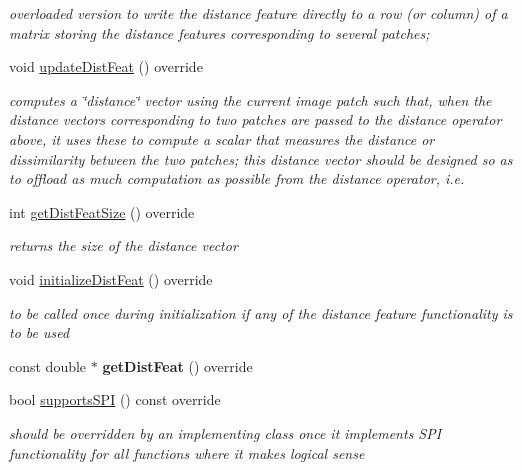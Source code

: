 \begin{DoxyCompactItemize}
\begin{DoxyCompactList}\small\item\em overloaded version to write the distance feature directly to a row (or column) of a matrix storing the distance features corresponding to several patches; \end{DoxyCompactList}\item 
void \hyperlink{classNCC_a0767a3d3ba75da9598a5817945d583bd}{update\-Dist\-Feat} () override
\begin{DoxyCompactList}\small\item\em computes a \char`\"{}distance\char`\"{} vector using the current image patch such that, when the distance vectors corresponding to two patches are passed to the distance operator above, it uses these to compute a scalar that measures the distance or dissimilarity between the two patches; this distance vector should be designed so as to offload as much computation as possible from the distance operator, i.\-e. \end{DoxyCompactList}\item 
\hypertarget{classNCC_a7df028c752f5caf03f141383ae0b8020}{int \hyperlink{classNCC_a7df028c752f5caf03f141383ae0b8020}{get\-Dist\-Feat\-Size} () override}\label{classNCC_a7df028c752f5caf03f141383ae0b8020}

\begin{DoxyCompactList}\small\item\em returns the size of the distance vector \end{DoxyCompactList}\item 
\hypertarget{classNCC_a7fb32218db2ed05cb91534994a7ea171}{void \hyperlink{classNCC_a7fb32218db2ed05cb91534994a7ea171}{initialize\-Dist\-Feat} () override}\label{classNCC_a7fb32218db2ed05cb91534994a7ea171}

\begin{DoxyCompactList}\small\item\em to be called once during initialization if any of the distance feature functionality is to be used \end{DoxyCompactList}\item 
\hypertarget{classNCC_a19d1bbc4688ec999f1c6abf8066b13a0}{const double $\ast$ {\bfseries get\-Dist\-Feat} () override}\label{classNCC_a19d1bbc4688ec999f1c6abf8066b13a0}

\item 
\hypertarget{classNCC_a59cf8e1836ba7ee19db72595c5c1f3a7}{bool \hyperlink{classNCC_a59cf8e1836ba7ee19db72595c5c1f3a7}{supports\-S\-P\-I} () const override}\label{classNCC_a59cf8e1836ba7ee19db72595c5c1f3a7}

\begin{DoxyCompactList}\small\item\em should be overridden by an implementing class once it implements S\-P\-I functionality for all functions where it makes logical sense \end{DoxyCompactList}\end{DoxyCompactItemize}
